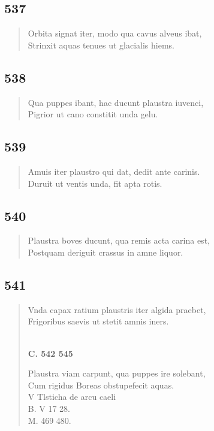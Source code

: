 \documentclass[11pt, a4paper]{report}
\begin{document}
            \subsection*{537}
      \begin{verse}
      Orbita signat iter, modo qua cavus alveus ibat, \\ Strinxit aquas tenues ut glacialis hiems. \\ 
      \end{verse}
  
            \subsection*{538}
      \begin{verse}
      Qua puppes ibant, hac ducunt plaustra iuvenci, \\ Pigrior ut cano constitit unda gelu. \\ 
      \end{verse}
  
            \subsection*{539}
      \begin{verse}
      Amuis iter plaustro qui dat, dedit ante carinis. \\ Duruit ut ventis unda, fit apta rotis. \\ 
      \end{verse}
  
            \subsection*{540}
      \begin{verse}
      Plaustra boves ducunt, qua remis acta carina est, \\ Postquam deriguit crassus in amne liquor. \\ 
      \end{verse}
  
            \subsection*{541}
      \begin{verse}
      Vnda capax ratium plaustris iter algida praebet, \\ Frigoribus saevis ut stetit amnis iners. \\ 
        ﻿\pagebreak 
     \marginpar{[69]} \begin{center} \textbf{C. 542 545} \end{center}Plaustra viam carpunt, qua puppes ire solebant, \\ Cum rigidus Boreas obstupefecit aquas. \\ V Tlsticha de arcu caeli \\ B. V 17 28. \\ M. 469 480. \\ 
      \end{verse}
  
\end{document}
